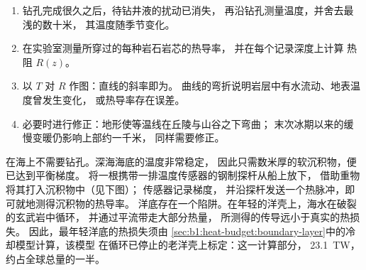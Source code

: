 \begin{method}[由钻孔测定热流]\label{met:b1:heat-budget:borehole}
\begin{enumerate}
  \item 钻孔完成很久之后，待钻井液的扰动已消失，
        再沿钻孔测量温度，并舍去最浅的数十米，
        其温度随季节变化。
  \item 在实验室测量所穿过的每种岩石岩芯的热导率，
        并在每个记录深度上计算
        热阻 $R(z)$。
  \item 以 $T$ 对 $R$ 作图：直线的斜率即为。
        曲线的弯折说明岩层中有水流动、地表温度曾发生变化，
        或热导率存在误差。
  \item 必要时进行修正：地形使等温线在丘陵与山谷之下弯曲；
        末次冰期以来的缓慢变暖仍影响上部约一千米，
        同样需要修正。
\end{enumerate}
\end{method}

在海上不需要钻孔。深海海底的温度非常稳定，
因此只需数米厚的软沉积物，便已达到平衡梯度。
将一根携带一排温度传感器的钢制探杆从船上放下，
借助重物将其打入沉积物中（见下图）；
传感器记录梯度，
并沿探杆发送一个热脉冲，即可就地测得沉积物的热导率。
洋底存在一个陷阱。在年轻的洋壳上，海水在破裂的玄武岩中循环，
并通过平流带走大部分热量，
所测得的传导远小于真实的热损失。
因此，最年轻洋底的热损失须由
\cref{sec:b1:heat-budget:boundary-layer}中的冷却模型计算，该模型
在循环已停止的老洋壳上标定：这一计算部分，
\qty{23.1}{TW}，约占全球总量的一半。%

